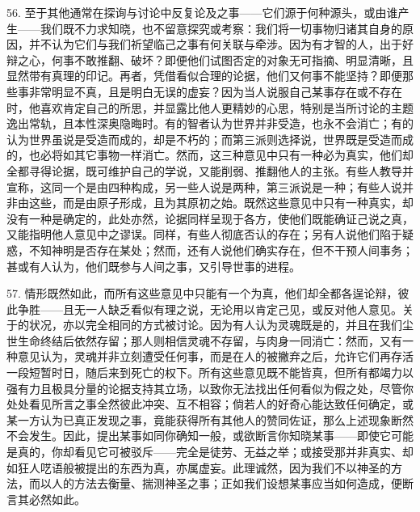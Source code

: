 56. 至于其他通常在探询与讨论中反复论及之事——它们源于何种源头，或由谁产生——我们既不力求知晓，也不留意探究或考察：我们将一切事物归诸其自身的原因，并不认为它们与我们祈望临己之事有何关联与牵涉。因为有才智的人，出于好辩之心，何事不敢推翻、破坏？即便他们试图否定的对象无可指摘、明显清晰，且显然带有真理的印记。再者，凭借看似合理的论据，他们又何事不能坚持？即便那些事非常明显不真，且是明白无误的虚妄？因为当人说服自己某事存在或不存在时，他喜欢肯定自己的所思，并显露比他人更精妙的心思，特别是当所讨论的主题逸出常轨，且本性深奥隐晦时。有的智者认为世界并非受造，也永不会消亡；有的认为世界虽说是受造而成的，却是不朽的；而第三派则选择说，世界既是受造而成的，也必将如其它事物一样消亡。然而，这三种意见中只有一种必为真实，他们却全都寻得论据，既可维护自己的学说，又能削弱、推翻他人的主张。有些人教导并宣称，这同一个是由四种构成，另一些人说是两种，第三派说是一种；有些人说并非由这些，而是由原子形成，且为其原初之始。既然这些意见中只有一种真实，却没有一种是确定的，此处亦然，论据同样呈现于各方，使他们既能确证己说之真，又能指明他人意见中之谬误。同样，有些人彻底否认的存在；另有人说他们陷于疑惑，不知神明是否存在某处；然而，还有人说他们确实存在，但不干预人间事务；甚或有人认为，他们既参与人间之事，又引导世事的进程。\par

57. 情形既然如此，而所有这些意见中只能有一个为真，他们却全都各逞论辩，彼此争胜——且无一人缺乏看似有理之说，无论用以肯定己见，或反对他人意见。关于的状况，亦以完全相同的方式被讨论。因为有人认为灵魂既是的，并且在我们尘世生命终结后依然存留；那人则相信灵魂不存留，与肉身一同消亡：然而，又有一种意见认为，灵魂并非立刻遭受任何事，而是在人的被撇弃之后，允许它们再存活一段短暂时日，随后来到死亡的权下。所有这些意见既不能皆真，但所有都竭力以强有力且极具分量的论据支持其立场，以致你无法找出任何看似为假之处，尽管你处处看见所言之事全然彼此冲突、互不相容；倘若人的好奇心能达致任何确定，或某一方认为已真正发现之事，竟能获得所有其他人的赞同佐证，那么上述现象断然不会发生。因此，提出某事如同你确知一般，或欲断言你知晓某事——即使它可能是真的，你却看见它可被驳斥——完全是徒劳、无益之举；或接受那并非真实、却如狂人呓语般被提出的东西为真，亦属虚妄。此理诚然，因为我们不以神圣的方法，而以人的方法去衡量、揣测神圣之事；正如我们设想某事应当如何造成，便断言其必然如此。\par

